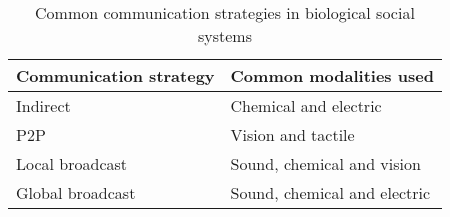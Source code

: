 \documentclass{intech}
\begin{document}
\begin{table}
\caption{Common communication strategies in biological social systems}
\label{table:bio-comm-strategy}
\begin{center}
\begin{tabular}{|l|l|}
\hline 
\textbf{Communication strategy} & \textbf{Common modalities used}\\
\hline 
Indirect & Chemical and electric \\
P2P &  Vision and tactile\\
Local broadcast &  Sound, chemical and vision\\
Global broadcast & Sound, chemical and electric\\
\hline
\end{tabular}
\end{center}
\end{table}
\end{document}
